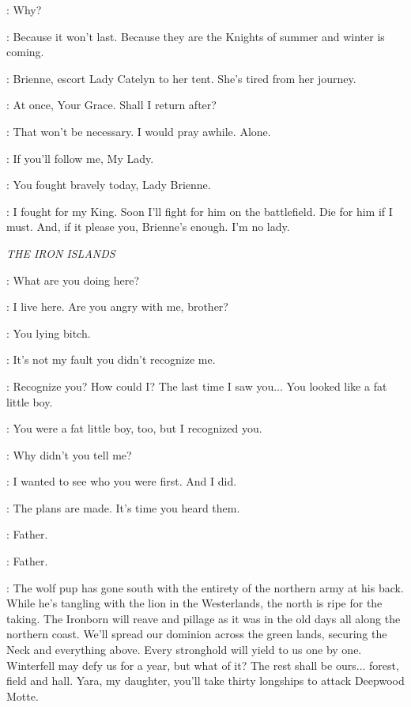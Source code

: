 \RENLY: Why? 

\CATELYN: Because it won't last. Because they are the Knights of summer and winter is coming. 

\RENLY: Brienne, escort Lady Catelyn to her tent. She's tired from her journey. 

\BRIENNE: At once, Your Grace. Shall I return after? 

\RENLY: That won't be necessary. I would pray awhile. Alone. 

\BRIENNE: If you'll follow me, My Lady. 


\CATELYN: You fought bravely today, Lady Brienne. 

\BRIENNE: I fought for my King. Soon I'll fight for him on the battlefield. Die for him if I must. And, if it please you, Brienne's enough. I'm no lady. 


\scene

\textit{THE IRON ISLANDS} 


\THEON: What are you doing here? 

\YARA: I live here. Are you angry with me, brother? 

\THEON: You lying bitch. 

\YARA: It's not my fault you didn't recognize me. 

\THEON: Recognize you? How could I? The last time I saw you$\ldots$ You looked like a fat little boy. 

\YARA: You were a fat little boy, too, but I recognized you. 

\THEON: Why didn't you tell me? 

\YARA: I wanted to see who you were first. And I did. 


\BALON: The plans are made. It's time you heard them. 

\YARA: Father. 

\THEON: Father. 

\BALON: The wolf pup has gone south with the entirety of the northern army at his back. While he's tangling with the lion in the Westerlands, the north is ripe for the taking. The Ironborn will reave and pillage as it was in the old days all along the northern coast. We'll spread our dominion across the green lands, securing the Neck and everything above. Every stronghold will yield to us one by one. Winterfell may defy us for a year, but what of it? The rest shall be ours$\ldots$ forest, field and hall. Yara, my daughter, you'll take thirty longships to attack Deepwood Motte. 

